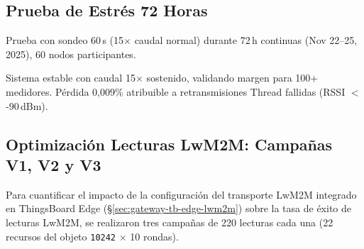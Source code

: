 \subsection{Prueba de Estrés 72 Horas}
\label{sec:resultados-estres}

Prueba con sondeo 60\,s (15$\times$ caudal normal) durante 72\,h continuas (Nov 22--25, 2025), 60 nodos participantes.

\begin{table}[H]
\centering
\caption{Resultados prueba de estrés 72\,h (60 medidores @ 60\,s sondeo)}
\label{tab:stress-test-72h}
\end{table}

Sistema estable con caudal 15$\times$ sostenido, validando margen para 100+ medidores. Pérdida 0,009\% atribuible a retransmisiones Thread fallidas (RSSI $<$-90\,dBm).

\subsection{Optimización Lecturas LwM2M: Campañas V1, V2 y V3}
\label{sec:resultados-v1v2v3}

Para cuantificar el impacto de la configuración del transporte LwM2M integrado en ThingsBoard Edge (§\ref{sec:gateway-tb-edge-lwm2m}) sobre la tasa de éxito de lecturas LwM2M, se realizaron tres campañas de 220 lecturas cada una (22 recursos del objeto \texttt{10242} $\times$ 10 rondas).

